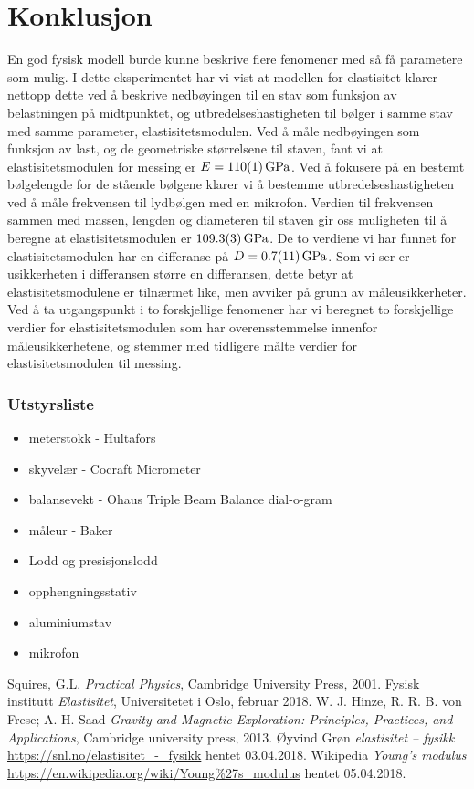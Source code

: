 \documentclass[%
 reprint,
 amsmath,amssymb,
 aps,
 norsk,
 booktabs
]{revtex4-1}
\begin{document}
\section{Konklusjon}
En god fysisk modell burde kunne beskrive flere fenomener med så få parametere som mulig. I dette eksperimentet har vi vist at modellen for elastisitet klarer nettopp dette ved å beskrive nedbøyingen til en stav som funksjon av belastningen på midtpunktet, og utbredelseshastigheten til bølger i samme stav med samme parameter, elastisitetsmodulen.
Ved å måle nedbøyingen som funksjon av last, og de geometriske størrelsene til staven, fant vi at elastisitetsmodulen for messing er $E=\SI{110\pm1}{\giga\pascal}$.
Ved å fokusere på en bestemt bølgelengde for de stående bølgene klarer vi å bestemme utbredelseshastigheten ved å måle frekvensen til lydbølgen med en mikrofon. Verdien til frekvensen sammen med massen, lengden og diameteren til staven gir oss muligheten til å beregne at elastisitetsmodulen er $\SI{109.3\pm0.3}{\giga\pascal}$.
De to verdiene vi har funnet for elastisitetsmodulen har en differanse på $D = \SI{0.7\pm1.1}{\giga\pascal}$. Som vi ser er usikkerheten i differansen større en differansen, dette betyr at elastisitetsmodulene er tilnærmet like, men avviker på grunn av måleusikkerheter. Ved å ta utgangspunkt i to forskjellige fenomener har vi beregnet to forskjellige verdier for elastisitetsmodulen som har overensstemmelse innenfor måleusikkerhetene, og stemmer med tidligere målte verdier for elastisitetsmodulen til messing.
\subsubsection*{Utstyrsliste}
\begin{itemize}
\label{utstyr}
\item meterstokk - Hultafors
\item skyvelær - Cocraft Micrometer
\item balansevekt - Ohaus Triple Beam Balance dial-o-gram
\item måleur - Baker
\item Lodd og presisjonslodd
\item opphengningsstativ
\item aluminiumstav
\item mikrofon
\end{itemize}
\begin{thebibliography}{9}
Squires, G.L. \emph{Practical Physics}, Cambridge University Press, 2001.
Fysisk institutt \emph{Elastisitet}, Universitetet i Oslo, februar 2018.
W. J. Hinze, R. R. B. von Frese; A. H. Saad \emph{Gravity and Magnetic Exploration: Principles, Practices, and Applications}, Cambridge university press, 2013.
Øyvind Grøn \emph{elastisitet – fysikk} \url{https://snl.no/elastisitet_-_fysikk} hentet 03.04.2018.
Wikipedia \emph{Young's modulus} \url{https://en.wikipedia.org/wiki/Young%27s_modulus} hentet 05.04.2018.
\end{thebibliography}
\end{document}
